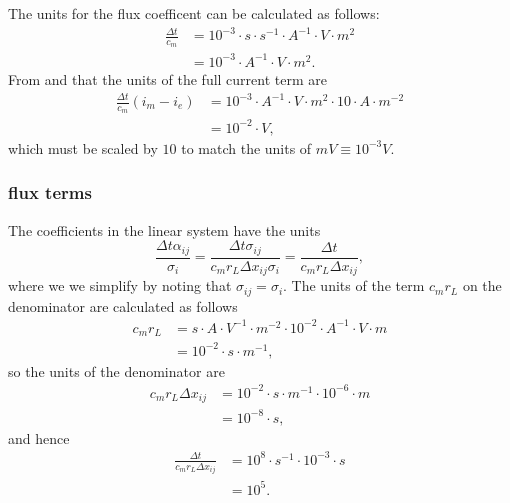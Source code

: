 The units for the flux coefficent can be calculated as follows:
\begin{align}
    \unit{ \frac{\Delta t}{c_m} } &= 10^{-3} \cdot s \cdot s^{-1}\cdot A^{-1}\cdot V\cdot m^2 \nonumber \\
                                  &= 10^{-3} \cdot A^{-1} \cdot V\cdot m^2. \label{eq:dtcm_unit}
\end{align}
From  and  that the units of the full current term are
\begin{align}
    \unit{ \frac{\Delta t}{c_m}\left(i_m - i_e\right) }
        &= 10^{-3} \cdot A^{-1} \cdot V\cdot m^2 \cdot 10 \cdot A \cdot m^{-2} \nonumber \\
        &= 10^{-2} \cdot V,
\end{align}
which must be scaled by $10$ to match the units of $mV\equiv10^{-3}V$.
\subsubsection{flux terms}
The coefficients in the linear system have the units
\begin{equation}
    \unit{ \frac{\Delta t\alpha_{ij}}{\sigma_i} }
    =
    \unit{ \frac{\Delta t \sigma_{ij} } {c_m r_L \Delta x_{ij} \sigma_i} }
    =
    \unit{ \frac{\Delta t } {c_m r_L \Delta x_{ij} } },
\end{equation}
where we we simplify by noting that $\unit{\sigma_{ij}}=\unit{\sigma_i}$.
The units of the term $c_m r_L$ on the denominator are calculated as follows
\begin{align}
    \unit{c_m r_L}
    &= s \cdot A \cdot V^{-1} \cdot m^{-2} \cdot 10^{-2} \cdot A^{-1} \cdot V \cdot m \nonumber \\
    &= 10^{-2} \cdot s \cdot m^{-1},
\end{align}
so the units of the denominator are
\begin{align}
    \unit{c_m r_L \Delta x_{ij}}
    &= 10^{-2} \cdot s \cdot m^{-1} \cdot 10^{-6} \cdot m \nonumber \\
    &= 10^{-8} \cdot s,
\end{align}
and hence
\begin{align}
    \unit{\frac{\Delta t } {c_m r_L \Delta x_{ij} }}
    &= 10^{8} \cdot s^{-1} \cdot 10^{-3} \cdot s \nonumber \\
    &= 10^{5}.
\end{align}

